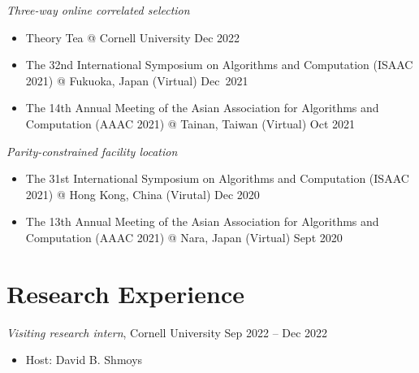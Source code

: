 \documentclass{article}
\newcommand{\killinitspace}{-0.7em}
\begin{document}
\textsl{Three-way online correlated selection}
\vspace{\killinitspace}
\begin{itemize}
\item Theory Tea @ Cornell University \hfill Dec 2022
\item The 32nd International Symposium on Algorithms and Computation (ISAAC 2021) @  Fukuoka, Japan (Virtual) \hfill Dec~2021
\item The 14th Annual Meeting of the Asian Association for Algorithms and Computation (AAAC 2021) @ Tainan, Taiwan (Virtual) \hfill Oct 2021
\end{itemize}

\textsl{Parity-constrained facility location}
\vspace{\killinitspace}
\begin{itemize}
\item The 31st International Symposium on Algorithms and Computation (ISAAC 2021) @ Hong Kong, China (Virutal) \hfill Dec 2020
\item The 13th Annual Meeting of the Asian Association for Algorithms and Computation (AAAC 2021) @ Nara, Japan (Virtual) \hfill Sept 2020
\end{itemize}

\section{Research Experience}
\textsl{Visiting research intern}, Cornell University \hfill Sep 2022 -- Dec 2022
\vspace{\killinitspace}
\begin{itemize}
\item Host: David B. Shmoys
\end{itemize}
\end{document}
